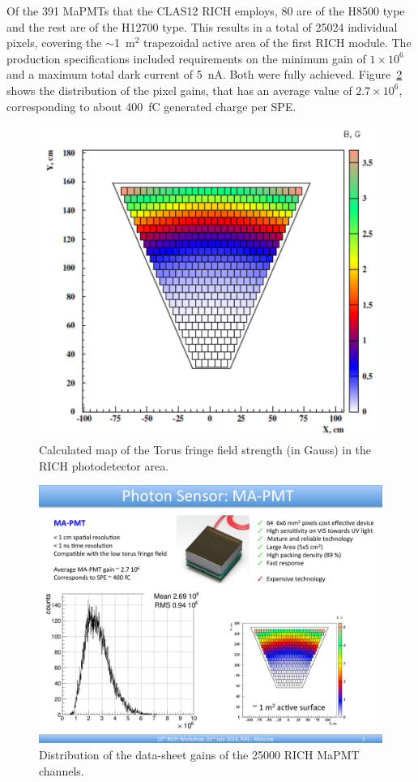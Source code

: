 \documentclass[5p,times,twocolumn]{elsarticle}
\begin{document}
Of the 391 MaPMTs that the CLAS12 RICH employs, 80 are of the H8500 type and the rest are of the H12700 type.
This results in a total of 25024 individual pixels, covering the $\sim$1~m$^2$ trapezoidal active area of the first
RICH module.
The production specifications included requirements on the minimum gain of $1 \times 10^6$ and a maximum total dark
current of 5~nA. Both were fully achieved. Figure~\ref{fig:MaPMTGain} shows the distribution of the pixel gains, that
has an average value of $2.7 \times 10^6$, corresponding to about 400~fC generated charge per SPE.

\begin{figure}[t]
\begin{center}
\includegraphics[width=0.85\columnwidth]{Field.pdf}
\end{center}
\caption{Calculated map of the Torus fringe field strength (in Gauss) in the RICH photodetector area.}
\label{fig:MagFringe}
\end{figure}

\begin{figure}[t]
\begin{center}
\includegraphics[width=0.85\columnwidth]{Gain.pdf}
\end{center}
\caption{Distribution of the data-sheet gains of the 25000 RICH MaPMT channels.}
\label{fig:MaPMTGain}
\end{figure}
\end{document}
